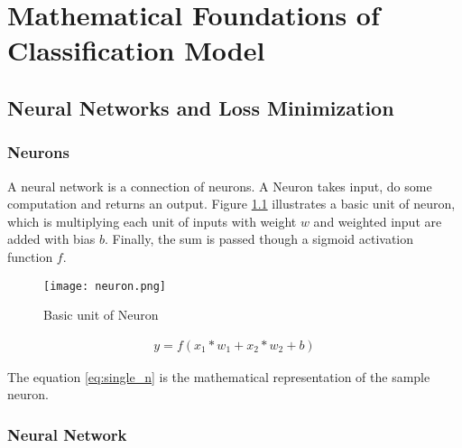 \chapter{Mathematical Foundations of Classification Model}

\section{Neural Networks and Loss Minimization}

\subsection*{Neurons}

A neural network is a connection of neurons. A Neuron takes input, do some computation and returns an output.  Figure \ref{fig:basic neuron} illustrates a basic unit of neuron, which is multiplying each unit of inputs with weight $w$ and weighted input are added with bias $b$. Finally, the sum is passed though a sigmoid activation function $ f $.  
\begin{figure}[H]
    \centering    
    \texttt{[image: neuron.png]}
    \caption{Basic unit of Neuron \parencite{VictorZhou}}
    \label{fig:basic neuron}
\end{figure}


\begin{align}
    y = f(x_1 * w_1 + x_2 * w_2 + b) \label{eq:single_n}
\end{align}

The equation \ref{eq:single_n} is the mathematical representation of the sample neuron.

\subsection*{Neural Network}





